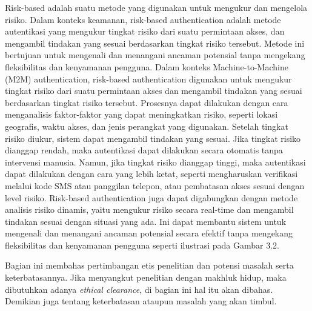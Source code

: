 Risk-based adalah suatu metode yang digunakan untuk mengukur dan
mengelola risiko. Dalam konteks keamanan, risk-based authentication adalah metode autentikasi yang mengukur tingkat risiko dari suatu permintaan akses, dan mengambil tindakan yang sesuai berdasarkan tingkat risiko tersebut. Metode ini bertujuan untuk mengenali dan menangani ancaman potensial tanpa mengekang fleksibilitas dan kenyamanan pengguna.
Dalam konteks Machine-to-Machine (M2M) authentication, risk-based authentication digunakan untuk mengukur tingkat risiko dari suatu permintaan akses dan mengambil tindakan yang sesuai berdasarkan tingkat risiko tersebut.
Prosesnya dapat dilakukan dengan cara menganalisis faktor-faktor yang dapat meningkatkan risiko, seperti lokasi geografis, waktu akses, dan jenis perangkat yang digunakan.
Setelah tingkat risiko diukur, sistem dapat mengambil tindakan yang sesuai. Jika tingkat risiko dianggap rendah, maka autentikasi dapat dilakukan secara otomatis tanpa intervensi manusia. Namun, jika tingkat risiko dianggap tinggi, maka autentikasi dapat dilakukan dengan cara yang lebih ketat, seperti mengharuskan verifikasi melalui kode SMS atau panggilan telepon, atau pembatasan akses sesuai dengan level risiko.
Risk-based authentication juga dapat digabungkan dengan metode analisis risiko dinamis, yaitu mengukur risiko secara real-time dan mengambil tindakan sesuai dengan situasi yang ada. Ini dapat membantu sistem untuk mengenali dan menangani ancaman potensial secara efektif tanpa mengekang fleksibilitas dan kenyamanan pengguna seperti ilustrasi pada Gambar 3.2.

Bagian ini membahas pertimbangan etis penelitian dan potensi masalah serta
keterbatasannya. Jika menyangkut penelitian dengan makhluk hidup, maka dibutuhkan adanya \textit{ethical clearance}, di bagian ini hal itu akan dibahas. Demikian juga tentang keterbatasan ataupun masalah yang akan timbul.